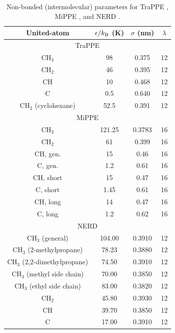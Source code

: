 \documentclass[journal=jced,manuscript=article]{achemso}
\begin{document}
    \begin{table}[h!]
		\caption{Non-bonded (intermolecular) parameters for TraPPE \cite{TraPPE,Martin1999}, MiPPE \cite{Mie,Potoff_branched}, and NERD \cite{NERD}.} \label{tab:nonbonded params}
		\begin{center}
			\begin{tabular}{|c|c|c|c|}
				\hline
				United-atom & $\epsilon/k_{\rm B}$ (K) & $\sigma$ (nm) & $\lambda$ \\ \hline
				\multicolumn{4}{|c|}{TraPPE} \\ \hline
				CH$_3$ & 98 & 0.375 & 12 \\ 
				CH$_2$ & 46 & 0.395 & 12\\ 
				CH & 10 & 0.468 & 12 \\
				C & 0.5 & 0.640 & 12 \\
				CH$_2$ (cyclohexane) & 52.5 & 0.391 & 12 \\
				\hline
				\multicolumn{4}{|c|}{MiPPE} \\ \hline
				CH$_3$ & 121.25 & 0.3783 & 16  \\ 
				CH$_2$ & 61 & 0.399 & 16 \\ 
				CH, gen. & 15 & 0.46 & 16\\
				C, gen. & 1.2 & 0.61 & 16\\
				CH, short & 15 & 0.47 & 16\\
				C, short & 1.45 & 0.61 & 16\\
				CH, long & 14 & 0.47 & 16\\
				C, long & 1.2 & 0.62 & 16\\
				\hline
                \multicolumn{4}{|c|}{NERD} \\ \hline
				CH$_3$ (general) & 104.00  & 0.3910 & 12\\ 
				CH$_3$ (2-methylpropane) & 78.23  & 0.3880 & 12\\ 
				CH$_3$ (2,2-dimethylpropane) & 74.50  & 0.3910 & 12 \\  
				CH$_3$ (methyl side chain) & 70.00 & 0.3850 & 12 \\
				CH$_3$ (ethyl side chain) & 83.00 & 0.3820 & 12 \\
				CH$_2$ & 45.80 & 0.3930 & 12 \\ 
				CH & 39.70 & 0.3850 & 12\\
				C & 17.00 & 0.3910 & 12 \\
				\hline
			\end{tabular}
		\end{center} 
	\end{table}
    
\end{document}
